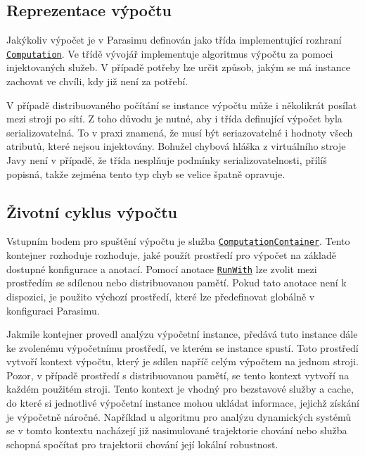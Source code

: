 \subsection{Reprezentace výpočtu}

Jakýkoliv výpočet je v Parasimu definován jako třída implementující rozhraní \href{https://github.com/sybila/parasim/blob/master/extensions/computation-lifecycle-api/src/main/java/org/sybila/parasim/computation/lifecycle/api/Computation.java}{\texttt{Computation}}. Ve třídě vývojář
implementuje algoritmus výpočtu za pomoci injektovaných služeb. V případě potřeby
lze určit způsob, jakým se má instance zachovat ve chvíli, kdy již není za potřebí.

V případě distribuovaného počítání se instance výpočtu může i ně\-ko\-lik\-rát posílat mezi stroji po sítí. Z toho důvodu
je nutné, aby i třída definující výpočet byla serializovatelná. To v praxi znamená, že musí
být seriazovatelné i hodnoty všech atributů, které nejsou injektovány. Bohužel chybová hláška z virtuálního stroje Javy
není v případě, že třída nesplňuje podmínky serializovatelnosti, přílíš popisná, takže
zejména tento typ chyb se velice špatně opravuje.

\subsection{Životní cyklus výpočtu}

Vstupním bodem pro spuštění výpočtu je služba \href{https://github.com/sybila/parasim/blob/master/extensions/computation-lifecycle-api/src/main/java/org/sybila/parasim/computation/lifecycle/api/ComputationContainer.java}{\texttt{ComputationContainer}}. Tento kontejner rozhoduje
rozhoduje, jaké použít prostředí pro výpočet na základě dostupné konfigurace a anotací.
Pomocí anotace \href{https://github.com/sybila/parasim/blob/master/extensions/computation-lifecycle-api/src/main/java/org/sybila/parasim/computation/lifecycle/api/annotations/RunWith.java}{\texttt{RunWith}} lze zvolit mezi prostředím se sdílenou nebo distribuovanou pamětí. Pokud tato anotace
není k dispozici, je použito výchozí prostředí, které lze předefinovat globálně v konfiguraci
Parasimu.

Jakmile kontejner provedl analýzu výpočetní instance, předává tuto instance dále
ke zvolenému výpočetnímu prostředí, ve kterém se instance spustí. Toto prostředí
vytvoří kontext výpočtu, který je sdílen napříč celým výpočtem na
jednom stroji. Pozor, v případě prostředí s distribuovanou pamětí, se tento kontext
vytvoří na každém použitém stroji. Tento kontext je vhodný pro bezstavové služby
a cache, do které si jednotlivé výpočetní instance mohou ukládat informace, jejichž
získání je vý\-po\-čet\-ně náročné. Například u algoritmu pro analýzu dynamických systémů
se v tomto kontextu nacházejí již nasimulované trajektorie chování nebo služba schopná spočítat
pro trajektorii chování její lokální robustnost.

